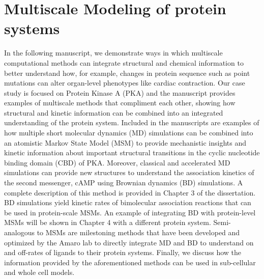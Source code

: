 \documentclass[12pt]{ucsddissertation}
\begin{document}
\chapter{Multiscale Modeling of protein systems}\label{first:chapter}
\vspace*{-1.2cm}
In the following manuscript, we demonstrate ways in which multiscale computational methods can integrate structural and chemical information to better understand how, for example, changes in protein sequence such as point mutations can alter organ-level phenotypes like cardiac contraction. Our case study is focused on Protein Kinase A (PKA) and the manuscript provides examples of multiscale methods that compliment each other, showing how structural and kinetic information can be combined into an integrated understanding of the protein system. Included in the manuscripts are examples of how multiple short molecular dynamics (MD) simulations can be combined into an atomistic Markov State Model (MSM) to provide mechanistic insights and kinetic information about important structural transitions in the cyclic nucleotide binding domain (CBD) of PKA. Moreover, classical and accelerated  MD simulations can provide new structures to understand the association kinetics of the second messenger, cAMP using Brownian dynamics (BD) simulations. A complete description of this method is provided in Chapter 3 of the dissertation. BD simulations yield kinetic rates of bimolecular association reactions that can be used in protein-scale MSMs. An example of integrating BD with protein-level MSMs will be shown in Chapter 4 with a different protein system. Semi-analogous to MSMs are milestoning methods that have been developed and optimized by the Amaro lab to directly integrate MD and BD to understand on and off-rates of ligands to their protein systems. Finally, we discuss how the information provided by the aforementioned methods can be used in sub-cellular and whole cell models. 




\end{document}

